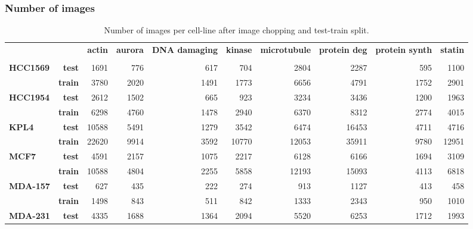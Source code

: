 \documentclass[a4paper,11pt,twoside,openright]{scrbook}
\begin{document}
\subsubsection{Number of images}
\begin{table}[h]
    \scriptsize
    \captionsetup{width=0.8\textwidth}
    \caption[Number of chopped images for MoA prediction]{Number of images per cell-line after image chopping and test-train split.}
    \label{table:chopped_image_count}
\begin{tabular}{lrrrrrrrrr}
\toprule
        &  &  \textbf{actin} & \textbf{aurora} & \textbf{DNA damaging} & \textbf{kinase} & \textbf{microtubule} & \textbf{protein deg} & \textbf{protein synth} & \textbf{statin} \\
&  &        &        &              &        &             &             &               &        \\
\midrule
\textbf{HCC1569} & \textbf{test} &   1691 &    776 &          617 &    704 &        2804 &        2287 &           595 &   1100 \\
        & \textbf{train} &   3780 &   2020 &         1491 &   1773 &        6656 &        4791 &          1752 &   2901 \\
\textbf{HCC1954} & \textbf{test} &   2612 &   1502 &          665 &    923 &        3234 &        3436 &          1200 &   1963 \\
        & \textbf{train} &   6298 &   4760 &         1478 &   2940 &        6370 &        8312 &          2774 &   4015 \\
\textbf{KPL4} & \textbf{test} &  10588 &   5491 &         1279 &   3542 &        6474 &       16453 &          4711 &   4716 \\
        & \textbf{train} &  22620 &   9914 &         3592 &  10770 &       12053 &       35911 &          9780 &  12951 \\
\textbf{MCF7} & \textbf{test} &   4591 &   2157 &         1075 &   2217 &        6128 &        6166 &          1694 &   3109 \\
        & \textbf{train} &  10588 &   4804 &         2255 &   5858 &       12193 &       15093 &          4113 &   6818 \\
\textbf{MDA-157} & \textbf{test} &    627 &    435 &          222 &    274 &         913 &        1127 &           413 &    458 \\
        & \textbf{train} &   1498 &    843 &          511 &    842 &        1333 &        2343 &           950 &   1010 \\
\textbf{MDA-231} & \textbf{test} &   4335 &   1688 &         1364 &   2094 &        5520 &        6253 &          1712 &   1993 \\

\end{tabular}
\end{table}
\end{document}
